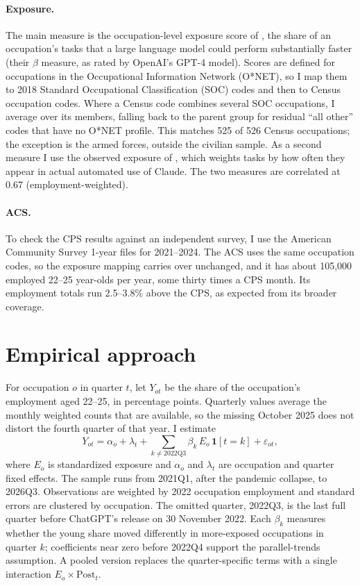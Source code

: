 \documentclass[11pt]{article}
\begin{document}
\paragraph{Exposure.} The main measure is the occupation-level exposure score of \citet{eloundou2024}, the share of an occupation's tasks that a large language model could perform substantially faster (their $\beta$ measure, as rated by OpenAI's GPT-4 model). Scores are defined for occupations in the Occupational Information Network (O*NET), so I map them to 2018 Standard Occupational Classification (SOC) codes and then to Census occupation codes. Where a Census code combines several SOC occupations, I average over its members, falling back to the parent group for residual ``all other'' codes that have no O*NET profile. This matches 525 of 526 Census occupations; the exception is the armed forces, outside the civilian sample. As a second measure I use the observed exposure of \citet{massenkoff2026}, which weights tasks by how often they appear in actual automated use of Claude. The two measures are correlated at 0.67 (employment-weighted).

\paragraph{ACS.} To check the CPS results against an independent survey, I use the American Community Survey 1-year files for 2021--2024. The ACS uses the same occupation codes, so the exposure mapping carries over unchanged, and it has about 105,000 employed 22--25 year-olds per year, some thirty times a CPS month. Its employment totals run 2.5--3.8\% above the CPS, as expected from its broader coverage.

\section{Empirical approach}

For occupation $o$ in quarter $t$, let $Y_{ot}$ be the share of the occupation's employment aged 22--25, in percentage points. Quarterly values average the monthly weighted counts that are available, so the missing October 2025 does not distort the fourth quarter of that year. I estimate
\begin{equation}
Y_{ot} = \alpha_o + \lambda_t + \sum_{k \neq \text{2022Q3}} \beta_k \, E_o \, \mathbf{1}[t = k] + \varepsilon_{ot},
\label{eq:es}
\end{equation}
where $E_o$ is standardized exposure and $\alpha_o$ and $\lambda_t$ are occupation and quarter fixed effects. The sample runs from 2021Q1, after the pandemic collapse, to 2026Q3. Observations are weighted by 2022 occupation employment and standard errors are clustered by occupation. The omitted quarter, 2022Q3, is the last full quarter before ChatGPT's release on 30 November 2022. Each $\beta_k$ measures whether the young share moved differently in more-exposed occupations in quarter $k$; coefficients near zero before 2022Q4 support the parallel-trends assumption. A pooled version replaces the quarter-specific terms with a single interaction $E_o \times \text{Post}_t$.
\end{document}
